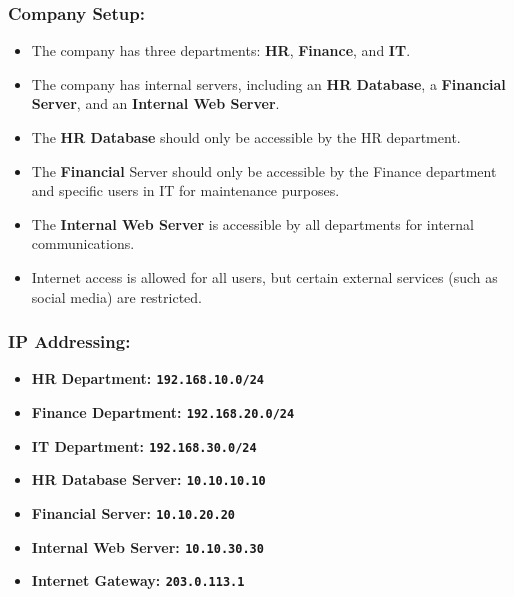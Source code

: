\documentclass[11pt,a4paper]{article}
\begin{document}
        \subsubsection*{Company Setup:}
            \begin{itemize}
                \item The company has three departments: \textbf{HR}, \textbf{Finance}, and \textbf{IT}.
                \item The company has internal servers, including an \textbf{HR Database}, a \textbf{Financial Server}, and an \textbf{Internal Web Server}.
                \item The \textbf{HR Database} should only be accessible by the HR department.
                \item The \textbf{Financial} Server should only be accessible by the Finance department and specific users in IT for maintenance purposes.
                \item The \textbf{Internal Web Server} is accessible by all departments for internal communications.
                \item Internet access is allowed for all users, but certain external services (such as social media) are restricted.
            \end{itemize}

        \subsubsection*{IP Addressing:}
            \begin{itemize}
                \item \textbf{HR Department: \lstinline{192.168.10.0/24}}
                \item \textbf{Finance Department: \lstinline{192.168.20.0/24}}
                \item \textbf{IT Department: \lstinline{192.168.30.0/24}}
                \item \textbf{HR Database Server: \lstinline{10.10.10.10}}
                \item \textbf{Financial Server: \lstinline{10.10.20.20}}
                \item \textbf{Internal Web Server: \lstinline{10.10.30.30}}
                \item \textbf{Internet Gateway: \lstinline{203.0.113.1}}
               
            \end{itemize}
            
\end{document}
